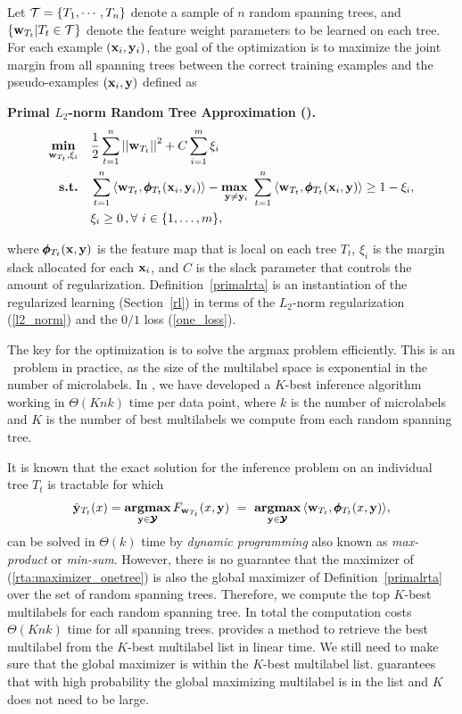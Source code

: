 {Let $\mathcal{T}=\{T_1,\cdots,T_n\}$ denote a sample of $n$ random spanning trees, and $\{\mathbf {w}_{T_t}|T_t\in\mathcal{T}\}$ denote the feature weight parameters to be learned on each tree.
For each example $(\mathbf {x}_i,\mathbf {y}_i)$, the goal of the optimization is to maximize the joint margin from all spanning trees between the correct training examples and the pseudo-examples $(\mathbf {x}_i,\mathbf {y})$ defined as
\begin{definition}{\bf Primal $L_2$-norm Random Tree Approximation (\rta).}\label{primalrta}
	\begin{align*}
		\underset{\vw_{T_t},\xi_i}{\minimize} & \quad \frac{1}{2}\sum_{t=1}^{n}\norm{\vw_{T_t}}^2 + C\sum_{i=1}^{m}\xi_i\\
		\st & \quad \sum_{t=1}^{n}{ \langle \vw_{T_t}, \phib_{T_t}(\vx_i,\vy_i) \rangle} - \underset{\vy \neq \vy_i}{\maximize\ } \sum_{t=1}^{n}{\langle \vw_{T_t}, \phib_{T_t}(\vx_i,\vy) \rangle } \geq 1 -  \xi_i, \\
		& \quad \xi_i\ge0\, , \forall\ i \in \set{1,\dots,m},
	\end{align*}
\end{definition}
\noindent
where $\pmb \phi_{T_t}(\mathbf {x},\mathbf {y})$ is the feature map that is local on each tree $T_t$, $\xi_i$ is the margin slack allocated for each $\mathbf {x}_i$, and $C$ is the slack parameter that controls the amount of regularization.
Definition~\ref{primalrta} is an instantiation of the regularized learning (Section~\ref{rl}) in terms of the $L_2$-norm regularization (\ref{l2_norm}) and the $0/1$ loss (\ref{one_loss}).

The key for the optimization is to solve the argmax problem efficiently.
This is an \nphard\ problem in practice, as the size of the multilabel space is exponential in the number of microlabels.
In , we have developed a $K$-best inference algorithm working in $\Theta(Knk)$ time per data point, where $k$ is the number of microlabels and $K$ is the number of best multilabels we compute from each random spanning tree.

It is known that the exact solution for the inference problem on an individual tree $T_t$ is tractable \citep{Koller09probabilistic} for which 
\begin{align}
	\hat{\mathbf {y}}_{T_t}(x) = \underset{\mathbf {y}\in\pmb {\mathcal{Y}}}{\textbf{argmax}}\, F_{\mathbf {w}_{T_t}}(x,\mathbf {y})\ =\ \underset{\mathbf {y}\in\pmb {\mathcal{Y}}}{\textbf{argmax}}\, \langle \mathbf {w}_{T_t}, \pmb \phi_{T_t}(x,\mathbf {y})\rangle, \label{rta:maximizer_onetree}
\end{align}
can be solved in $\Theta(k)$ time by \textit{dynamic programming} also known as \textit{max-product} or \textit{min-sum}.
However, there is no guarantee that the maximizer of (\ref{rta:maximizer_onetree}) is also the global maximizer of Definition~\ref{primalrta} over the set of random spanning trees.
Therefore, we compute the top $K$-best multilabels for each random spanning tree.
In total the computation costs $\Theta(Knk)$ time for all spanning trees.
 provides a method to retrieve the best multilabel from the $K$-best multilabel list in linear time.
We still need to make sure that the global maximizer is within the $K$-best multilabel list.
 guarantees that with high probability the global maximizing multilabel is in the list and $K$ does not need to be large.

}
